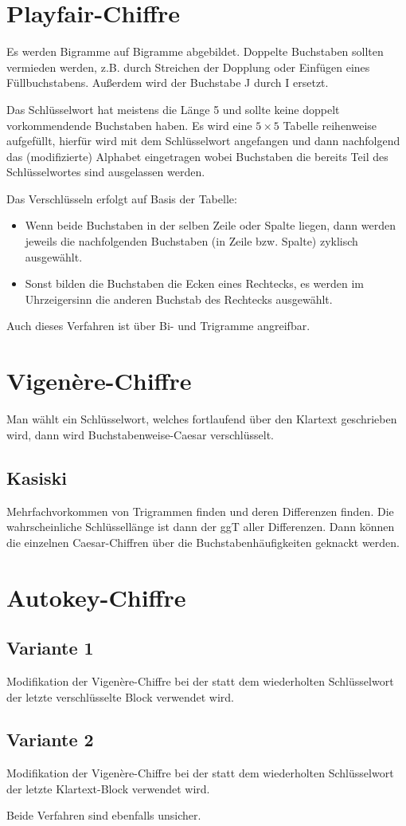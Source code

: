 \section{Playfair-Chiffre}
Es werden Bigramme auf Bigramme abgebildet. Doppelte Buchstaben sollten vermieden werden,
z.B. durch Streichen der Dopplung oder Einfügen eines Füllbuchstabens. Außerdem wird der
Buchstabe J durch I ersetzt.

Das Schlüsselwort hat meistens die Länge 5 und sollte keine doppelt vorkommendende 
Buchstaben haben. Es wird eine $5 \times 5$ Tabelle reihenweise aufgefüllt, hierfür
wird mit dem Schlüsselwort angefangen und dann nachfolgend das (modifizierte) Alphabet
eingetragen wobei Buchstaben die bereits Teil des Schlüsselwortes sind ausgelassen werden.

Das Verschlüsseln erfolgt auf Basis der Tabelle:
\begin{itemize}
    \item Wenn beide Buchstaben in der selben Zeile oder Spalte liegen, dann werden 
        jeweils die nachfolgenden Buchstaben (in Zeile bzw. Spalte) zyklisch ausgewählt.
    \item Sonst bilden die Buchstaben die Ecken eines Rechtecks, es werden im Uhrzeigersinn
          die anderen Buchstab des Rechtecks ausgewählt.
\end{itemize}

Auch dieses Verfahren ist über Bi- und Trigramme angreifbar.

\section{Vigenère-Chiffre}
Man wählt ein Schlüsselwort, welches fortlaufend über den Klartext geschrieben wird, dann wird Buchstabenweise-Caesar verschlüsselt.

\subsection{Kasiski}
Mehrfachvorkommen von Trigrammen finden und deren Differenzen finden. 
Die wahrscheinliche Schlüssellänge ist dann der ggT aller Differenzen.
Dann können die einzelnen Caesar-Chiffren über die Buchstabenhäufigkeiten geknackt werden.

\section{Autokey-Chiffre}
\subsection{Variante 1}
Modifikation der Vigenère-Chiffre bei der statt dem wiederholten Schlüsselwort der letzte verschlüsselte Block verwendet wird.

\subsection{Variante 2}
Modifikation der Vigenère-Chiffre bei der statt dem wiederholten Schlüsselwort der letzte Klartext-Block verwendet wird.

Beide Verfahren sind ebenfalls unsicher.

